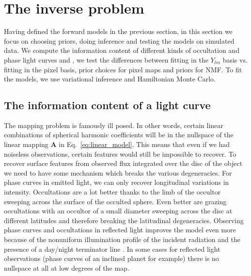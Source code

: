 \documentclass[modern]{aastex62}
\begin{document}

\section{The inverse problem}
\label{sec:inverse_problem}
Having defined the forward models in the previous section, in this section we focus on choosing priors, doing inference and testing the models on simulated data.
We compute the information content of different kinds of occultation and phase light curves and , we test the differences between fitting in the $Y_{lm}$ basis vs. fitting in the pixel basis, prior choices for pixel maps and priors for NMF. 
To fit the models, we use  variational inference and Hamiltonian Monte Carlo.

\subsection{The information content of a light curve}
\label{ssec:information_content}
The mapping problem is famously ill posed.
In other words, certain linear combinations of spherical harmonic coefficients will be in the nullspace of the linear mapping  $\mathbf{A}$ in Eq.~\ref{eq:linear_model}.
This means that even if we had noiseless observations, certain features would still be impossible to recover.
To recover surface features from observed flux integrated over the disc of the object we need
to have some mechanism which breaks the various degeneracies.
For phase curves in emitted light, we can only recover longitudinal variations in intensity.
Occultations are a lot better thanks to the limb of the occultor sweeping across the surface of the occulted sphere.
Even better are grazing occultations with an occultor of a small diameter sweeping across the disc at different latitudes and therefore breaking the latitudinal degeneracies. 
Observing phase curves and occultations in reflected light improves the model even more because of the nonuniform illumination profile of the incident radiation and the presence of a day/night terminator line \citep[][Luger et al. 2020 in prep]{luger_starry_2019}.
In some cases for reflected light observations (phase curves of an inclined planet for example) there is no nullspace at all at low degrees of the map.
\end{document}
